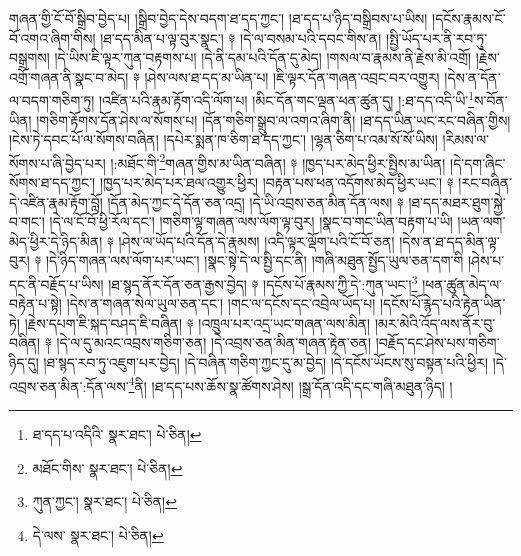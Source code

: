 གཞན་གྱི་ངོ་བོ་སྒྲིབ་བྱེད་པ། །སྒྲིབ་བྱེད་དེས་བདག་ཐ་དད་ཀྱང་། །ཐ་དད་པ་ཉིད་བསྒྲིབས་པ་ཡིས། །དངོས་རྣམས་ངོ་བོ་འགའ་ཞིག་གིས། །ཐ་དད་མིན་པ་ལྟ་བུར་སྣང་། ༈ །དེ་ལ་བསམ་པའི་དབང་གིས་ན། །སྤྱི་ཡོད་པར་ནི་རབ་ཏུ་བསྒྲགས། །དེ་ཡིས་ཇི་ལྟར་ཀུན་བརྟགས་པ། །དེ་ནི་དམ་པའི་དོན་དུ་མེད། །གསལ་བ་རྣམས་ནི་རྗེས་མི་འགྲོ། །རྗེས་འགྲོ་གཞན་ནི་སྣང་བ་མེད། ༈ །ཤེས་ལས་ཐ་དད་མ་ཡིན་པ། །ཇི་ལྟར་དོན་གཞན་འབྲང་བར་འགྱུར། །དེས་ན་དོན་ལ་བདག་གཅིག་ཏུ། །འཛིན་པའི་རྣམ་རྟོག་འདི་ལོག་པ། །མིང་དོན་གང་ལྡན་ཕན་ཚུན་དུ། །:ཐ་དད་འདི་ཡི་\footnote{ཐ་དད་པ་འདིའི་  སྣར་ཐང་།  པེ་ཅིན། }ས་བོན་ཡིན། །གཅིག་རྟོགས་དོན་ཤེས་ལ་སོགས་པ། །དོན་གཅིག་སྒྲུབ་ལ་འགའ་ཞིག་ནི། །ཐ་དད་ཡིན་ཡང་རང་བཞིན་གྱིས། །ངེས་ཏེ་དབང་པོ་ལ་སོགས་བཞིན། །དཔེར་སྨན་ཁ་ཅིག་ཐ་དད་ཀྱང་། །ལྷན་ཅིག་པ་འམ་སོ་སོ་ཡིས། །རིམས་ལ་སོགས་པ་ཞི་བྱེད་པར། །:མཐོང་གི་\footnote{མཐོང་གིས་  སྣར་ཐང་།  པེ་ཅིན། }གཞན་གྱིས་མ་ཡིན་བཞིན། ༈ །ཁྱད་པར་མེད་ཕྱིར་སྤྱིས་མ་ཡིན། །དེ་དག་ཞིང་སོགས་ཐ་དད་ཀྱང་། །ཁྱད་པར་མེད་པར་ཐལ་འགྱུར་ཕྱིར། །བརྟན་པས་ཕན་འདོགས་མེད་ཕྱིར་ཡང་། ༈ །རང་བཞིན་དེ་འཛིན་རྣམ་རྟོག་བློ། །དོན་མེད་ཀྱང་དེ་དོན་ཅན་འདྲ། །དེ་ཡི་འབྲས་ཅན་མིན་དོན་ལས། ༈ །ཐ་དད་མཐར་ཐུག་སྐྱེ་བ་གང་། །དེ་ལ་ངོ་བོ་ཕྱི་རོལ་དང་། །གཅིག་ལྟ་གཞན་ལས་ལོག་ལྟ་བུར། །སྣང་བ་གང་ཡིན་བརྟག་པ་ཡི། །ཡན་ལག་མེད་ཕྱིར་དེ་ཉིད་མིན། ༈ །ཤེས་ལ་ཡོད་པའི་དོན་དེ་རྣམས། །འདི་ལྟར་ལྡོག་པའི་ངོ་བོ་ཅན། །དེས་ན་ཐ་དད་མིན་ལྟ་བུར། ༈ །དེ་ཉིད་གཞན་ལས་ལོག་པར་ཡང་། །སྣང་སྟེ་དེ་ལ་སྤྱི་དང་ནི། །གཞི་མཐུན་སྤྱོད་ཡུལ་ཅན་དག་གི །ཤེས་པ་དང་ནི་བརྗོད་པ་ཡིས། །ཐ་སྙད་ནོར་དོན་ཅན་རྒྱས་བྱེད། ༈ །དངོས་པོ་རྣམས་ཀྱི་དེ་:ཀུན་ཡང་།\footnote{ཀུན་ཀྱང་།  སྣར་ཐང་།  པེ་ཅིན། } །ཕན་ཚུན་མེད་ལ་བརྟེན་པ་སྟེ། །དེས་ན་གཞན་སེལ་ཡུལ་ཅན་དང་། །གང་ལ་དངོས་དང་འབྲེལ་ཡོད་པ། །དངོས་པོ་རྙེད་པའི་རྟེན་ཡིན་ཏེ། །རྗེས་དཔག་ཇི་སྐད་བཤད་ཇི་བཞིན། ༈ །འཁྲུལ་པར་འདྲ་ཡང་གཞན་ལས་མིན། །མར་མེའི་འོད་ལས་ནོར་བུ་བཞིན། ༈ །དེ་ལ་དུ་མའང་འབྲས་གཅིག་ཅན། །དེ་འབྲས་ཅན་མིན་གཞན་རྟེན་ཅན། །བརྗོད་དང་ཤེས་པས་གཅིག་ཉིད་དུ། །ཐ་སྙད་རབ་ཏུ་འཇུག་པར་བྱེད། །དེ་བཞིན་གཅིག་ཀྱང་དུ་མ་བྱེད། །དེ་དངོས་ཡོངས་སུ་བསྟན་པའི་ཕྱིར། །དེ་འབྲས་ཅན་མིན་:དོན་ལས་\footnote{དེ་ལས་  སྣར་ཐང་།  པེ་ཅིན། }ནི། །ཐ་དད་པས་ཆོས་སྣ་ཚོགས་ཤེས། །སྒྲ་དོན་འདི་དང་གཞི་མཐུན་ཉིད། །
